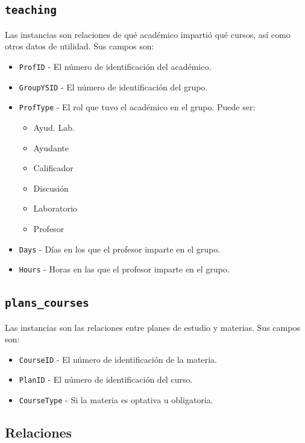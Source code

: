 \documentclass[twocolumn]{article}
\theoremstyle{definition}
\begin{document}
\subsection{\texttt{teaching}}

Las instancias son relaciones de qué académico impartió qué cursos, así como otros datos de utilidad. Sus campos son:

\begin{itemize}
    \item \texttt{ProfID} - El número de identificación del académico.
    \item \texttt{GroupYSID} - El número de identificación del grupo.
    \item \texttt{ProfType} - El rol que tuvo el académico en el grupo. Puede ser:
    \begin{itemize}
        \item Ayud. Lab.
        \item Ayudante
        \item Calificador
        \item Discusión
        \item Laboratorio
        \item Profesor
    \end{itemize}
    \item \texttt{Days} - Días en los que el profesor imparte en el grupo.
    \item \texttt{Hours} - Horas en las que el profesor imparte en el grupo.
\end{itemize}

\subsection{\texttt{plans\_courses}}
Las instancias son las relaciones entre planes de estudio y materias. Sus campos son:

\begin{itemize}
    \item \texttt{CourseID} - El número de identificación de la materia.
    \item \texttt{PlanID} - El número de identificación del curso.
    \item \texttt{CourseType} - Si la materia es optativa u obligatoria.
\end{itemize}

\subsection{Relaciones}
\end{document}
